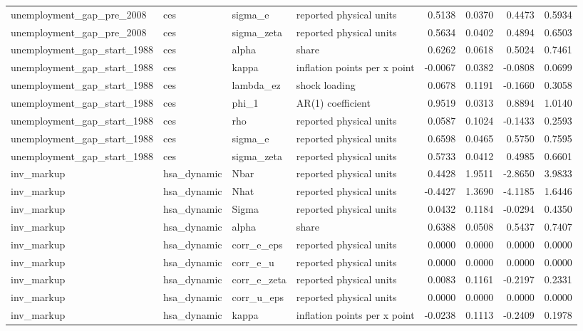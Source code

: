 \begin{tabular}{llllrrrr}
unemployment\_gap\_pre\_2008 & ces & sigma\_e & reported physical units & 0.5138 & 0.0370 & 0.4473 & 0.5934 \\
unemployment\_gap\_pre\_2008 & ces & sigma\_zeta & reported physical units & 0.5634 & 0.0402 & 0.4894 & 0.6503 \\
unemployment\_gap\_start\_1988 & ces & alpha & share & 0.6262 & 0.0618 & 0.5024 & 0.7461 \\
unemployment\_gap\_start\_1988 & ces & kappa & inflation points per x point & -0.0067 & 0.0382 & -0.0808 & 0.0699 \\
unemployment\_gap\_start\_1988 & ces & lambda\_ez & shock loading & 0.0678 & 0.1191 & -0.1660 & 0.3058 \\
unemployment\_gap\_start\_1988 & ces & phi\_1 & AR(1) coefficient & 0.9519 & 0.0313 & 0.8894 & 1.0140 \\
unemployment\_gap\_start\_1988 & ces & rho & reported physical units & 0.0587 & 0.1024 & -0.1433 & 0.2593 \\
unemployment\_gap\_start\_1988 & ces & sigma\_e & reported physical units & 0.6598 & 0.0465 & 0.5750 & 0.7595 \\
unemployment\_gap\_start\_1988 & ces & sigma\_zeta & reported physical units & 0.5733 & 0.0412 & 0.4985 & 0.6601 \\
inv\_markup & hsa\_dynamic & Nbar & reported physical units & 0.4428 & 1.9511 & -2.8650 & 3.9833 \\
inv\_markup & hsa\_dynamic & Nhat & reported physical units & -0.4427 & 1.3690 & -4.1185 & 1.6446 \\
inv\_markup & hsa\_dynamic & Sigma & reported physical units & 0.0432 & 0.1184 & -0.0294 & 0.4350 \\
inv\_markup & hsa\_dynamic & alpha & share & 0.6388 & 0.0508 & 0.5437 & 0.7407 \\
inv\_markup & hsa\_dynamic & corr\_e\_eps & reported physical units & 0.0000 & 0.0000 & 0.0000 & 0.0000 \\
inv\_markup & hsa\_dynamic & corr\_e\_u & reported physical units & 0.0000 & 0.0000 & 0.0000 & 0.0000 \\
inv\_markup & hsa\_dynamic & corr\_e\_zeta & reported physical units & 0.0083 & 0.1161 & -0.2197 & 0.2331 \\
inv\_markup & hsa\_dynamic & corr\_u\_eps & reported physical units & 0.0000 & 0.0000 & 0.0000 & 0.0000 \\
inv\_markup & hsa\_dynamic & kappa & inflation points per x point & -0.0238 & 0.1113 & -0.2409 & 0.1978 \\

\end{tabular}
